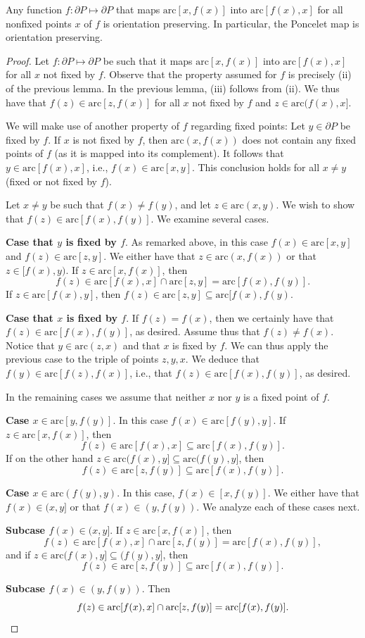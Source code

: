 \documentclass[10pt,a4paper]{amsart}
\newcommand{\arc}{\mathrm{arc}}
\begin{document}
\begin{proposition}\label{piorientation}
Any function $f\colon\partial P\mapsto \partial P$ that maps $\arc[x,f(x)]$ into $\arc[f(x),x]$ for all nonfixed points $x$ of $f$ is orientation preserving. In particular, the Poncelet map is orientation preserving.    
\end{proposition}

\begin{proof}
Let $f\colon\partial P\mapsto \partial P$ be such that it maps $\arc[x,f(x)]$ into $\arc[f(x),x]$ for all $x$ not fixed by $f$.
Observe that the property assumed for $f$ is precisely (ii) of the previous lemma. In the previous lemma, (iii) follows from (ii). We thus have that $f(z)\in\arc[z,f(x)]$ for all $x$ not fixed by $f$ and $z\in \arc(f(x),x]$. 

We will make use of another property of $f$ regarding fixed points: Let $y\in \partial P$ be fixed by $f$.
If $x$ is not fixed by $f$, then $\arc(x,f(x))$ does not contain any fixed points of $f$ (as it is mapped into its complement).
It follows that $y\in \arc[f(x),x]$, i.e., $f(x)\in \arc[x,y]$. This conclusion holds  for all $x\neq y$ (fixed or not fixed by $f$). 


Let $x\neq y$ be such that $f(x)\neq f(y)$, and let $z\in \arc(x,y)$. We wish to show that  $f(z)\in \arc[f(x),f(y)]$. 
We examine several cases.

\textbf{Case that $y$ is fixed by $f$}. As remarked above, in this case  $f(x)\in\arc[x,y]$ and $f(z)\in \arc[z,y]$. We either have that  $z\in \arc(x,f(x))$ or that $z\in [f(x),y)$. If $z\in\arc[x,f(x)]$, then 
\[
f(z)\in \arc[f(x),x]\cap\arc[z,y]=\arc[f(x),f(y)].
\] 
If $z\in \arc [f(x),y]$, then $f(z)\in \arc[z,y]\subseteq \arc[f(x),f(y)$. 

\textbf{Case that $x$ is fixed by $f$}. If $f(z)=f(x)$, then we certainly have that $f(z)\in\arc[f(x),f(y)]$, as desired.
Assume thus that $f(z)\neq f(x)$. Notice that  $y\in \arc(z,x)$ and that $x$ is fixed by $f$. We can thus apply the previous case 
to the triple of points $z,y,x$. We deduce that $f(y)\in \arc[f(z),f(x)]$, i.e., that $f(z)\in \arc[f(x),f(y)]$, as desired.


In the remaining cases we assume that neither $x$ nor $y$ is a fixed point of $f$.


\textbf{Case  $x\in \arc[y,f(y)]$}. In this case $f(x)\in \arc[f(y),y]$. If $z\in \arc[x,f(x)]$, then
\[
f(z)\in \arc[f(x),x]\subseteq \arc[f(x),f(y)].
\]
If on the other hand $z\in \arc(f(x),y]\subseteq \arc(f(y),y]$, then 
\[
f(z)\in \arc[z,f(y)]\subseteq \arc[f(x),f(y)].
\]


\textbf{Case $x\in \arc(f(y),y)$}. 
In this case, $f(x)\in [x,f(y)]$. We  either have that $f(x)\in (x,y]$ or that $f(x)\in (y,f(y))$. We analyze each of these cases next.

\textbf{Subcase $f(x)\in (x,y]$}. If $z\in \arc[x,f(x)]$, then
\[
f(z)\in \arc[f(x),x]\cap \arc[z,f(y)]=\arc[f(x),f(y)],
\] 
and if $z\in \arc (f(x),y]\subseteq (f(y),y]$, then 
\[
f(z)\in \arc[z,f(y)]\subseteq \arc[f(x),f(y)].
\]


\textbf{Subcase $f(x)\in (y,f(y))$}. Then
\[
f(z)\in \arc[f(x),x]\cap \arc[z,f(y)]=\arc[f(x),f(y)].\qedhere
\]
\end{proof}
\end{document}
